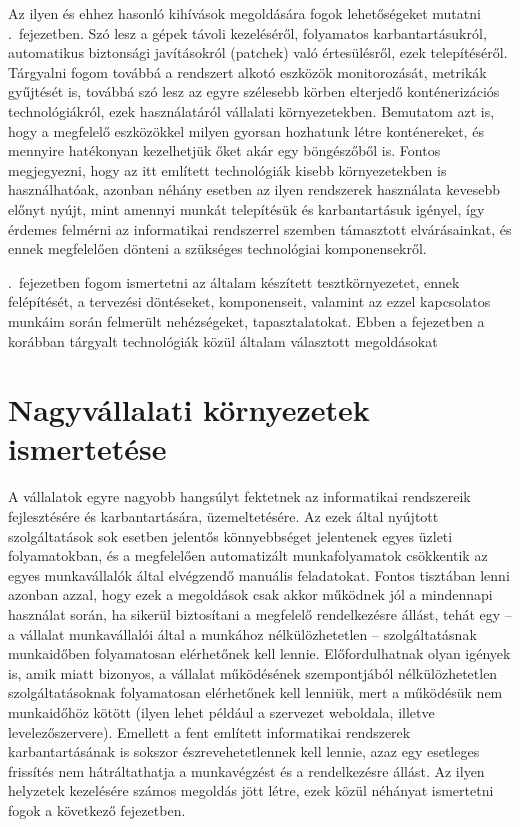 Az ilyen és ehhez hasonló kihívások megoldására fogok lehetőségeket mutatni .~fejezetben. Szó lesz a gépek távoli kezeléséről, folyamatos karbantartásukról, automatikus biztonsági javításokról (patchek) való értesülésről, ezek telepítéséről. Tárgyalni fogom továbbá a rendszert alkotó eszközök monitorozását, metrikák gyűjtését is, továbbá szó lesz az egyre szélesebb körben elterjedő konténerizációs technológiákról, ezek használatáról vállalati környezetekben. Bemutatom azt is, hogy a megfelelő eszközökkel milyen gyorsan hozhatunk létre konténereket, és mennyire hatékonyan kezelhetjük őket akár egy böngészőből is.
Fontos megjegyezni, hogy az itt említett technológiák kisebb környezetekben is használhatóak, azonban néhány esetben az ilyen rendszerek használata kevesebb előnyt nyújt, mint amennyi munkát telepítésük és karbantartásuk igényel, így érdemes felmérni az informatikai rendszerrel szemben támasztott elvárásainkat, és ennek megfelelően dönteni a szükséges technológiai komponensekről.

.~fejezetben fogom ismertetni az általam készített tesztkörnyezetet, ennek felépítését, a tervezési döntéseket, komponenseit, valamint az ezzel kapcsolatos munkáim során felmerült nehézségeket, tapasztalatokat. Ebben a fejezetben a korábban tárgyalt technológiák közül általam választott megoldásokat 

\section{Nagyvállalati környezetek ismertetése}
A vállalatok egyre nagyobb hangsúlyt fektetnek az informatikai rendszereik fejlesztésére és karbantartására, üzemeltetésére. Az ezek által nyújtott szolgáltatások sok esetben jelentős könnyebbséget jelentenek egyes üzleti folyamatokban, és a megfelelően automatizált munkafolyamatok csökkentik az egyes munkavállalók által elvégzendő manuális feladatokat. Fontos tisztában lenni azonban azzal, hogy ezek a megoldások csak akkor működnek jól a mindennapi használat során, ha sikerül biztosítani a megfelelő rendelkezésre állást, tehát egy -- a vállalat munkavállalói által a munkához nélkülözhetetlen -- szolgáltatásnak munkaidőben folyamatosan elérhetőnek kell lennie. Előfordulhatnak olyan igények is, amik miatt bizonyos, a vállalat működésének szempontjából nélkülözhetetlen szolgáltatásoknak folyamatosan elérhetőnek kell lenniük, mert a működésük nem munkaidőhöz kötött (ilyen lehet például a szervezet weboldala, illetve levelezőszervere).  Emellett a fent említett informatikai rendszerek karbantartásának is sokszor észrevehetetlennek kell lennie, azaz egy esetleges frissítés nem hátráltathatja a munkavégzést és a rendelkezésre állást. Az ilyen helyzetek kezelésére számos megoldás jött létre, ezek közül néhányat ismertetni fogok a következő fejezetben.


